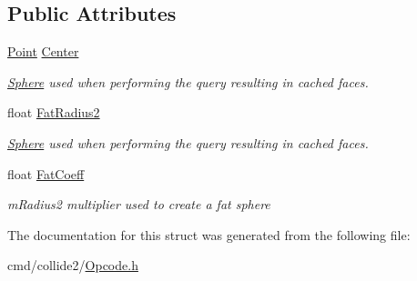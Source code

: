 \subsection*{Public Attributes}
\begin{DoxyCompactItemize}
\item 
\hyperlink{classOpcode_1_1Point}{Point} \hyperlink{structOpcode_1_1SphereCache_a9aec55ed38604338d7d16a064e7a7d2a}{Center}\hypertarget{structOpcode_1_1SphereCache_a9aec55ed38604338d7d16a064e7a7d2a}{}\label{structOpcode_1_1SphereCache_a9aec55ed38604338d7d16a064e7a7d2a}

\begin{DoxyCompactList}\small\item\em \hyperlink{classOpcode_1_1Sphere}{Sphere} used when performing the query resulting in cached faces. \end{DoxyCompactList}\item 
float \hyperlink{structOpcode_1_1SphereCache_a569c556cabbae7105a6eed3da5c2f229}{Fat\+Radius2}\hypertarget{structOpcode_1_1SphereCache_a569c556cabbae7105a6eed3da5c2f229}{}\label{structOpcode_1_1SphereCache_a569c556cabbae7105a6eed3da5c2f229}

\begin{DoxyCompactList}\small\item\em \hyperlink{classOpcode_1_1Sphere}{Sphere} used when performing the query resulting in cached faces. \end{DoxyCompactList}\item 
float \hyperlink{structOpcode_1_1SphereCache_ae5787abfe6729081daf010d466cd59e7}{Fat\+Coeff}\hypertarget{structOpcode_1_1SphereCache_ae5787abfe6729081daf010d466cd59e7}{}\label{structOpcode_1_1SphereCache_ae5787abfe6729081daf010d466cd59e7}

\begin{DoxyCompactList}\small\item\em m\+Radius2 multiplier used to create a fat sphere \end{DoxyCompactList}\end{DoxyCompactItemize}


The documentation for this struct was generated from the following file\+:\begin{DoxyCompactItemize}
\item 
cmd/collide2/\hyperlink{Opcode_8h}{Opcode.\+h}\end{DoxyCompactItemize}
